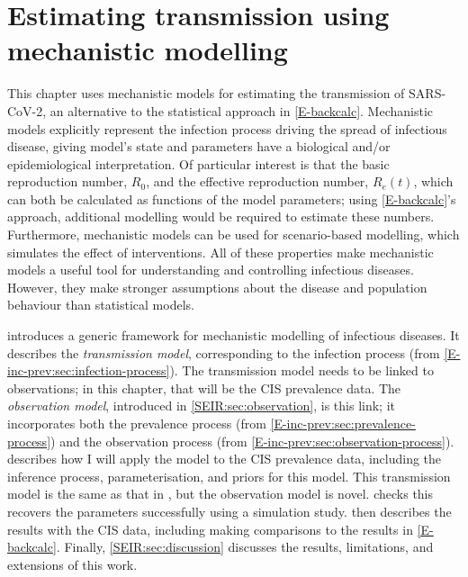 \documentclass[thesis.tex]{subfiles}
\begin{document}
\ifSubfilesClassLoaded{
    \setcounter{chapter}{7}
}

\chapter{Estimating transmission using mechanistic modelling} \label{SEIR}

This chapter uses mechanistic models for estimating the transmission of SARS-CoV-2, an alternative to the statistical approach in \cref{E-backcalc}.
Mechanistic models explicitly represent the infection process driving the spread of infectious disease, giving model's state and parameters have a biological and/or epidemiological interpretation.
Of particular interest is that the basic reproduction number, $R_0$, and the effective reproduction number, $R_e(t)$, which can both be calculated as functions of the model parameters; using \cref{E-backcalc}'s approach, additional modelling would be required to estimate these numbers.
Furthermore, mechanistic models can be used for scenario-based modelling, which simulates the effect of interventions.
All of these properties make mechanistic models a useful tool for understanding and controlling infectious diseases.
However, they make stronger assumptions about the disease and population behaviour than statistical models.

 introduces a generic framework for mechanistic modelling of infectious diseases.
It describes the \emph{transmission model}, corresponding to the infection process (from \cref{E-inc-prev:sec:infection-process}).
The transmission model needs to be linked to observations; in this chapter, that will be the CIS prevalence data.
The \emph{observation model}, introduced in \cref{SEIR:sec:observation}, is this link; it incorporates both the prevalence process (from \cref{E-inc-prev:sec:prevalence-process}) and the observation process (from \cref{E-inc-prev:sec:observation-process}).
 describes how I will apply the model to the CIS prevalence data, including the inference process, parameterisation, and priors for this model.
This transmission model is the same as that in \textcite{birrellRealtime}, but the observation model is novel.
 checks this recovers the parameters successfully using a simulation study.
 then describes the results with the CIS data, including making comparisons to the results in \cref{E-backcalc}.
Finally, \cref{SEIR:sec:discussion} discusses the results, limitations, and extensions of this work.
\end{document}
